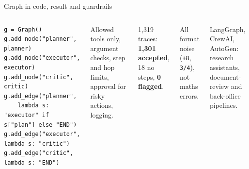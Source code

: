 \documentclass[aspectratio=169,11pt]{beamer}
\begin{document}
\begin{frame}[fragile]{Graph in code, result and guardrails}
\begin{columns}[T]
\begin{bcode}
\begin{lstlisting}
g = Graph()
g.add_node("planner", planner)
g.add_node("executor", executor)
g.add_node("critic", critic)
g.add_edge("planner",
    lambda s: "executor" if s["plan"] else "END")
g.add_edge("executor", lambda s: "critic")
g.add_edge("critic", lambda s: "END")
\end{lstlisting}
\end{bcode}
\begin{bdef}[Guardrails]
Allowed tools only, argument checks, step and hop limits, approval for risky actions, logging.
\end{bdef}
\begin{bres}
1,319 traces: \textbf{1,301 accepted}, 18 no steps, \textbf{0 flagged}.
\end{bres}
\begin{bwarn}
All format noise (\texttt{+8}, \texttt{3/4}), not maths errors.
\end{bwarn}
\begin{bapp}
LangGraph, CrewAI, AutoGen: research assistants, document-review and back-office pipelines.
\end{bapp}
\end{columns}
\end{frame}

\end{document}
